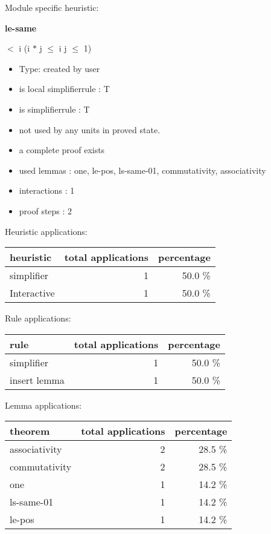 \documentclass[a4paper]{article}
\begin{document}
Module specific heuristic:

\pagebreak

{\LARGE\bf le-same}\label{lemma-le-same}

\medskip

  $<$ i \Imp (i $*$ j $\le$ i \Equiv j $\le$ 1)

\begin{itemize}

\item Type: created by user

\item is local simplifierrule : T
\item is simplifierrule : T
\item not used by any units in proved state.
\item       a complete proof exists
\item       used lemmas  : one, le-pos, ls-same-01, commutativity, associativity
\item       interactions : 1
\item       proof steps  : 2
\end{itemize}

\medskip


Heuristic applications:

\begin{supertabular}{l|r|r}
heuristic	& total applications & percentage \\ \hline
simplifier & 1 & 50.0 \% \\
Interactive & 1 & 50.0 \% \\

\end{supertabular}

Rule applications:

\begin{supertabular}{l|r|r}
rule	        & total applications & percentage \\ \hline
simplifier & 1 & 50.0 \% \\
insert lemma & 1 & 50.0 \% \\

\end{supertabular}

Lemma applications:

\begin{supertabular}{l|r|r}
theorem	        & total applications & percentage \\ \hline
associativity & 2 & 28.5 \% \\
commutativity & 2 & 28.5 \% \\
one & 1 & 14.2 \% \\
ls-same-01 & 1 & 14.2 \% \\
le-pos & 1 & 14.2 \% \\

\end{supertabular}
\end{document}
